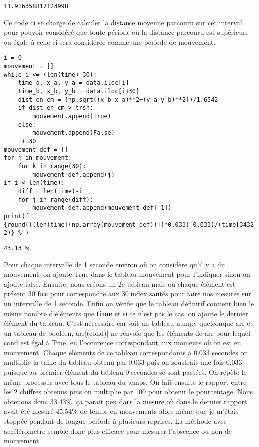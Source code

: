 \documentclass[11pt]{article}
\begin{document}
\label{org7b096a2}
\begin{verbatim}
11.916358817123998
\end{verbatim}


Ce code ci se charge de calculer la distance moyenne parcouru sur cet interval pour pouvoir considéré que toute période où la distance parcouru est
supérieure ou égale à celle ci sera considérée comme une période de mouvement.

\begin{verbatim}
i = 0
mouvement = []
while i <= (len(time)-30):
    time_a, x_a, y_a = data.iloc[i]
    time_b, x_b, y_b = data.iloc[i+30]
    dist_en_cm = (np.sqrt((x_b-x_a)**2+(y_a-y_b)**2))/1.6542
    if dist_en_cm > trsh:
        mouvement.append(True)
    else:
        mouvement.append(False)
    i+=30
mouvement_def = []
for j in mouvement:
    for k in range(30):
        mouvement_def.append(j)
if i < len(time):
    diff = len(time)-i
    for j in range(diff):
        mouvement_def.append(mouvement_def[-1])
print(f"{round(((len(time[(np.array(mouvement_def))])*0.033)-0.033)/(time[3432])*100, 2)} %")
\end{verbatim}

\label{orge3a7293}
\begin{verbatim}
43.13 %
\end{verbatim}


Pour chaque intervalle de 1 seconde environ où on considère qu'il y a du mouvement, on ajoute True dans le tableau mouvement pour l'indiquer sinon on
ajoute false. Ensuite, nous créons un 2e tableau mais où chaque élément est présent 30 fois pour correspondre aux 30 index sautés pour faire nos
mesures sur un intervalle de 1 seconde. Enfin on vérifie que le tableau définitif contient bien le même nombre d'éléments que \textbf{time} et si ce n'est
pas le cas, on ajoute le dernier élément du tableau. C'est nécessaire car soit un tableau numpy quelconque arr et un tableau de booléen, arr[(cond)]
ne renvoie que les éléments de arr pour lequel cond est égal à True, en l'occurence correspondant aux moments où on est en mouvement. Chaque éléments
de ce tableau correspondants à 0,033 secondes on multiplie la taille du tableau obtenu par 0,033 puis on soustrait une fois 0,033 puisque au premier
élément du tableau 0 secondes se sont passées. On répète le même processus avec tous le tableau du temps. On fait ensuite le rapport entre les 2
chiffres obtenus puis on multiplie par 100 pour obtenir le pourcentage. Nous obtenons donc 33.43\%, ça parait peu dans la mesure où dans le dernier
rapport avait été mesuré 45.54\% de temps en mouvements alors même que je m'étais stoppée pendant de longue periode à plusieurs reprises. La méthode
avec accéléromètre semble donc plus efficace pour mesurer l'abscence ou non de mouvement.
\end{document}
